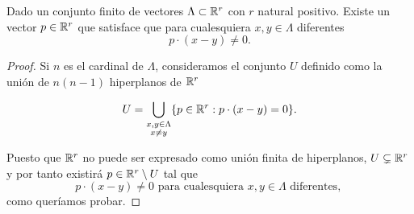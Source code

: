 \begin{lema}\label{lema:previo_propio_2_al_teorema_2_5}
    Dado un conjunto finito de vectores $\Lambda \subset \mathbb{R}^r$ con 
    $r$ natural positivo. 
    Existe un vector $p \in \mathbb{R}^r$ que satisface que 
    para cualesquiera $x,y \in \Lambda$ diferentes 
    \begin{equation}
        p \cdot(x-y) \neq 0.
    \end{equation}
\end{lema}
\begin{proof}
    Si $n$ es el cardinal de $\Lambda$,
    consideramos el conjunto $U$ definido como la unión de 
    $n (n-1)$ hiperplanos de $\mathbb{R}^r$

    \begin{equation}
        U = \bigcup_{ 
            \substack{
                x,y \in \Lambda \\
                x \neq y
            }
        }
        \{ 
            p \in \mathbb{R}^r: p \cdot (x-y) = 0
        \}.
    \end{equation}

    Puesto que $\mathbb{R}^r$ no puede ser expresado como unión finita de hiperplanos,
    $U \subsetneq \mathbb{R}^r$ y por tanto existirá $p \in \mathbb{R}^r \setminus U$ tal que 
    \begin{equation}
        p \cdot(x-y) \neq 0 
        \text{ para cualesquiera }
         x,y \in \Lambda \text{ diferentes, }
    \end{equation}
    como queríamos probar. 
\end{proof}

